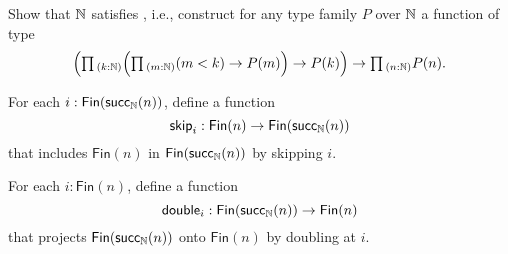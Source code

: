\begin{exercises}
\begin{subexenum}
\begin{equation*}
    \end{equation*}
  \item Show that ${\mathbb{N}}$ satisfies , i.e., construct for any type family $P$ over ${\mathbb{N}}$ a function of type
    \begin{equation*}
      \Big(\prd{k:\N} \Big(\prd{m:\N} (m< k) \to P(m)\Big)\to P(k)\Big) \to \prd{n:\N}P(n).
    \end{equation*}
  \end{subexenum}
\item
  \begin{subexenum}
  \item For each $i:\mathsf{Fin}(\mathsf{succ}_{{\mathbb{N}}}(n))$, define a function
    \begin{equation*}
      \mathsf{skip}_i : \mathsf{Fin}(n)\to\mathsf{Fin}(\mathsf{succ}_{{\mathbb{N}}}(n))
    \end{equation*}
    that includes $\mathsf{Fin}(n)$ in $\mathsf{Fin}(\mathsf{succ}_{{\mathbb{N}}}(n))$ by skipping $i$.
  \item For each $i:\mathsf{Fin}(n)$, define a function
    \begin{equation*}
      \mathsf{double}_i : \mathsf{Fin}(\mathsf{succ}_{{\mathbb{N}}}(n))\to\mathsf{Fin}(n)
    \end{equation*}
    that projects $\mathsf{Fin}(\mathsf{succ}_{{\mathbb{N}}}(n))$ onto $\mathsf{Fin}(n)$ by doubling at $i$. 
  \end{subexenum}
\end{exercises}
